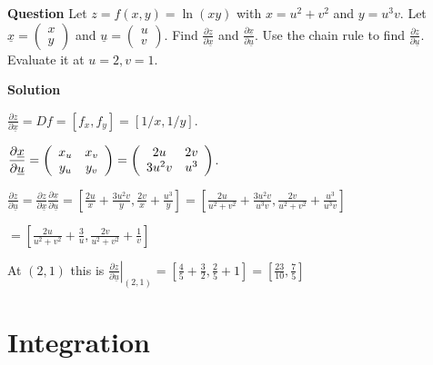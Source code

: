 \documentclass[12pt,letterpaper,noanswers]{exam}
\begin{document}
\noindent\textbf{Question}
Let $z = f(x,y) = \ln(xy)$ with $x = u^2+v^2$ and $y = u^3v$.  Let $\displaystyle\underline{x} = \left(\begin{array}{c} x\\ y\end{array}\right)$ and $\displaystyle\underline{u} = \left(\begin{array}{c} u\\ v\end{array}\right)$. Find $\displaystyle\frac{\partial z}{\partial\underline{x}}$ and $\displaystyle\frac{\partial \underline{x}}{\partial\underline{u}}$.  Use the chain rule to find $\displaystyle\frac{\partial z}{\partial\underline{u}}$.  Evaluate it at $u = 2, v = 1$.

\noindent\textbf{Solution} 


$\displaystyle\frac{\partial z}{\partial\underline{x}} = Df = [f_x, f_y] = [1/x, 1/y]$.
\vspace{0.2cm}

$\displaystyle\frac{\partial \underline{x}}{\partial\underline{u}} = \left(\begin{array}{c c} x_u & x_v \\ y_u & y _v\end{array}\right) = \left(\begin{array}{c c} 2u & 2v \\ 3u^2v & u^3 \end{array}\right)$.
\vspace{0.2cm}

$\displaystyle\frac{\partial z}{\partial\underline{u}} = \frac{\partial z}{\partial\underline{x}}\frac{\partial \underline{x}}{\partial\underline{u}} = \left[\frac{2u}{x}+\frac{3u^2v}{y}, \frac{2v}{x}+\frac{u^3}{y}\right] = \left[\frac{2u}{u^2+v^2} + \frac{3u^2v}{u^3v}, \frac{2v}{u^2+v^2}+\frac{u^3}{u^3v}\right] $

\hfill$\displaystyle= \left[\frac{2u}{u^2+v^2} + \frac{3}{u}, \frac{2v}{u^2+v^2}+\frac{1}{v}\right]$
\vspace{0.2cm}

At $(2,1)$ this is $\displaystyle\left.\frac{\partial z}{\partial\underline{u}} \right\vert_{(2,1)} = \left[\frac{4}{5} + \frac{3}{2}, \frac{2}{5}+1\right] = \left[\frac{23}{10}, \frac{7}{5}\right]$




\section{Integration}
\end{document}
